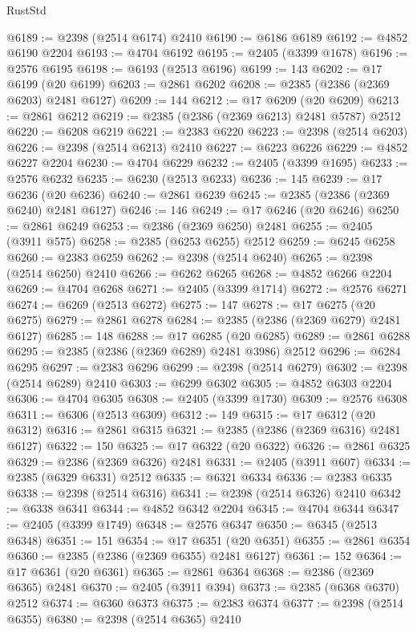 \begin{lexlean}{RustStd}
\begin{coremodule}
{\begin{coremodule}
{{{{{{{{{{{{{{{{{{{{{{{{{{{{{{{{{{{{{{{{{{{{{{{{{{@6189 := @2398 (@2514 @6174) @2410
@6190 := @6186 @6189
@6192 := @4852 @6190 @2204
@6193 := @4704 @6192
@6195 := @2405 (@3399 @1678)
@6196 := @2576 @6195
@6198 := @6193 (@2513 @6196)
@6199 := 143
@6202 := @17 @6199 (@20 @6199)
@6203 := @2861 @6202
@6208 := @2385 (@2386 (@2369 @6203) @2481 @6127)
@6209 := 144
@6212 := @17 @6209 (@20 @6209)
@6213 := @2861 @6212
@6219 := @2385 (@2386 (@2369 @6213) @2481 @5787) @2512
@6220 := @6208 @6219
@6221 := @2383 @6220
@6223 := @2398 (@2514 @6203)
@6226 := @2398 (@2514 @6213) @2410
@6227 := @6223 @6226
@6229 := @4852 @6227 @2204
@6230 := @4704 @6229
@6232 := @2405 (@3399 @1695)
@6233 := @2576 @6232
@6235 := @6230 (@2513 @6233)
@6236 := 145
@6239 := @17 @6236 (@20 @6236)
@6240 := @2861 @6239
@6245 := @2385 (@2386 (@2369 @6240) @2481 @6127)
@6246 := 146
@6249 := @17 @6246 (@20 @6246)
@6250 := @2861 @6249
@6253 := @2386 (@2369 @6250) @2481
@6255 := @2405 (@3911 @575)
@6258 := @2385 (@6253 @6255) @2512
@6259 := @6245 @6258
@6260 := @2383 @6259
@6262 := @2398 (@2514 @6240)
@6265 := @2398 (@2514 @6250) @2410
@6266 := @6262 @6265
@6268 := @4852 @6266 @2204
@6269 := @4704 @6268
@6271 := @2405 (@3399 @1714)
@6272 := @2576 @6271
@6274 := @6269 (@2513 @6272)
@6275 := 147
@6278 := @17 @6275 (@20 @6275)
@6279 := @2861 @6278
@6284 := @2385 (@2386 (@2369 @6279) @2481 @6127)
@6285 := 148
@6288 := @17 @6285 (@20 @6285)
@6289 := @2861 @6288
@6295 := @2385 (@2386 (@2369 @6289) @2481 @3986) @2512
@6296 := @6284 @6295
@6297 := @2383 @6296
@6299 := @2398 (@2514 @6279)
@6302 := @2398 (@2514 @6289) @2410
@6303 := @6299 @6302
@6305 := @4852 @6303 @2204
@6306 := @4704 @6305
@6308 := @2405 (@3399 @1730)
@6309 := @2576 @6308
@6311 := @6306 (@2513 @6309)
@6312 := 149
@6315 := @17 @6312 (@20 @6312)
@6316 := @2861 @6315
@6321 := @2385 (@2386 (@2369 @6316) @2481 @6127)
@6322 := 150
@6325 := @17 @6322 (@20 @6322)
@6326 := @2861 @6325
@6329 := @2386 (@2369 @6326) @2481
@6331 := @2405 (@3911 @607)
@6334 := @2385 (@6329 @6331) @2512
@6335 := @6321 @6334
@6336 := @2383 @6335
@6338 := @2398 (@2514 @6316)
@6341 := @2398 (@2514 @6326) @2410
@6342 := @6338 @6341
@6344 := @4852 @6342 @2204
@6345 := @4704 @6344
@6347 := @2405 (@3399 @1749)
@6348 := @2576 @6347
@6350 := @6345 (@2513 @6348)
@6351 := 151
@6354 := @17 @6351 (@20 @6351)
@6355 := @2861 @6354
@6360 := @2385 (@2386 (@2369 @6355) @2481 @6127)
@6361 := 152
@6364 := @17 @6361 (@20 @6361)
@6365 := @2861 @6364
@6368 := @2386 (@2369 @6365) @2481
@6370 := @2405 (@3911 @394)
@6373 := @2385 (@6368 @6370) @2512
@6374 := @6360 @6373
@6375 := @2383 @6374
@6377 := @2398 (@2514 @6355)
@6380 := @2398 (@2514 @6365) @2410
}}}}}}}}}}}}}}}}}}}}}}}}}}}}}}}}}}}}}}}}}}}}}}}}}}
\end{coremodule}}
\end{coremodule}
\end{lexlean}
